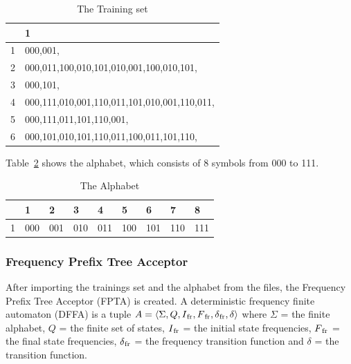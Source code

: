 \documentclass[
a4paper,
12pt
]{scrartcl}
\newcommand{\gray}{\cellcolor{grayself}}  %
\begin{document}
\begin{table}[h]
\centering
\begin{tabular}{|l|l|}
\hline
\gray & \gray  1                                 \\ \hline
\gray 1& 000,001,                                    \\ \hline
\gray 2& 000,011,100,010,101,010,001,100,010,101,   \\ \hline
\gray 3& 000,101,                                    \\ \hline
\gray 4& 000,111,010,001,110,011,101,010,001,110,011, \\ \hline
\gray 5& 000,111,011,101,110,001,                    \\ \hline
\gray 6& 000,101,010,101,110,011,100,011,101,110,    \\ \hline
\end{tabular}
\caption{The Training set}
\label{table:trainingsSet}
\end{table}

Table~\ref{table:alphabet} shows the alphabet, which consists of 8 symbols from 000 to 111.

\begin{table}[ht!]
\centering
\begin{tabular}{|l|l|l|l|l|l|l|l|l|}
\hline
\gray & \gray 1 & \gray 2 & \gray 3 & \gray 4 & \gray 5 & \gray 6 & \gray 7 & \gray 8 \\ \hline
\gray 1 & 000 & 001 & 010 & 011 & 100 & 101 & 110 & 111 \\ \hline
\end{tabular}
\caption{The Alphabet}
\label{table:alphabet}
\end{table}

\subsubsection{Frequency Prefix Tree Acceptor}
After importing the trainings set and the alphabet from the files, the Frequency Prefix Tree Acceptor (FPTA) is created. A deterministic frequency finite automaton (DFFA) is a tuple $A = \langle \Sigma, Q, I\textsubscript{fr}, F\textsubscript{fr}, \delta\textsubscript{fr}, \delta \rangle$ where $ \Sigma $ = the finite alphabet, $Q$ = the finite set of states, $I\textsubscript{fr}$ = the initial state frequencies, $F\textsubscript{fr}$ = the final state frequencies, $\delta\textsubscript{fr}$ = the frequency transition function and $ \delta$ = the transition function.
\end{document}

